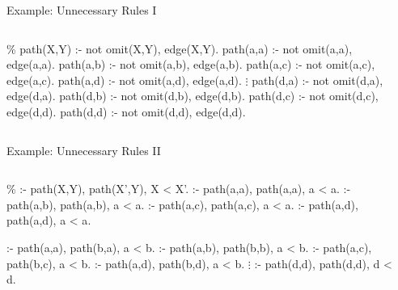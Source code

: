 \begin{frame}[fragile]{Example: Unnecessary Rules I}
  \vfill
  \begin{columns}
    \begin{column}{0.6\textwidth}
      \begin{minipage}{0.6\textwidth}
      \begin{semiverbatim}
{\color{comment}\% path(X,Y) :- not omit(X,Y), edge(X,Y).}
path(a,a) :- not omit(a,a), \alert{edge(a,a)}.
path(a,b) :- not omit(a,b), edge(a,b).
path(a,c) :- not omit(a,c), edge(a,c).
path(a,d) :- not omit(a,d), \alert{edge(a,d)}.
          \(\vdots\)
path(d,a) :- not omit(d,a), edge(d,a).
path(d,b) :- not omit(d,b), \alert{edge(d,b).}
path(d,c) :- not omit(d,c), \alert{edge(d,d).}
path(d,d) :- not omit(d,d), \alert{edge(d,d).}


      \end{semiverbatim}
    \end{minipage}
    \end{column}
    \begin{column}{0.25\textwidth}
      \Graph
    \end{column}
  \end{columns}
\end{frame}

\begin{frame}[fragile]{Example: Unnecessary Rules II}
  \vfill
  \begin{columns}
    \begin{column}{0.6\textwidth}
      \begin{minipage}{0.6\textwidth}
      \begin{semiverbatim}
{\color{comment}\% :- path(X,Y), path(X',Y), X < X'.}
:- \alert{path(a,a)}, \alert{path(a,a)}, \alert{a < a}.
:- path(a,b), path(a,b), \alert{a < a}.
:- path(a,c), path(a,c), \alert{a < a}.
:- \alert{path(a,d)}, \alert{path(a,d)}, \alert{a < a}.

:- \alert{path(a,a)}, \alert{path(b,a)}, a < b.
:- path(a,b), \alert{path(b,b)}, a < b.
:- path(a,c), path(b,c), a < b.
:- \alert{path(a,d)}, path(b,d), a < b.
          \(\vdots\)
:- \alert{path(d,d)}, \alert{path(d,d)}, \alert{d < d}.
      \end{semiverbatim}
    \end{minipage}
    \end{column}
    \begin{column}{0.25\textwidth}
      \Graph
    \end{column}
  \end{columns}
\end{frame}
%
